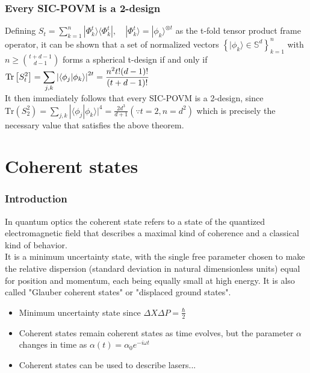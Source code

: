 \documentclass{beamer}
\begin{document}
\begin{frame}
  \frametitle{Every SIC-POVM is a 2-design}
  Defining
  ${\displaystyle S_{t}=\displaystyle \sum
        _{k=1}^{n}|\Phi _{k}^{t}\rangle \langle \Phi _{k}^{t}|,\quad |\Phi
        _{k}^{t}\rangle =|\phi _{k}\rangle ^{\otimes t}}$ as the t-fold tensor
  product frame operator,
  it can be shown that a set of normalized vectors
  ${\displaystyle \left\{|\phi _{k}\rangle \in
    \mathbb {S} ^{d}\right\}_{k=1}^{n}}$ with
  ${\displaystyle n\geq \binom{t+d-1}{d-1}}$ forms a spherical t-design if and
  only if ${\displaystyle \displaystyle \mathrm {Tr}
    \left[S_{t}^{2}\right]=\sum _{j,k}\left|\langle \phi _{j}|\phi _{k}\rangle
    \right|^{2t}={\frac {n^{2}t!(d-1)!}{(t+d-1)!}}}$\\
  It then immediately follows that every SIC-POVM is a 2-design, since
  ${\displaystyle \mathrm {Tr} (S_{2}^{2})=\displaystyle
    \sum _{j,k}|\langle \phi _{j}|\phi _{k}\rangle |^{4}={\frac {2d^{3}}{d+1}}} (\because t=2, n=d^{2})$
  which is precisely the necessary value that satisfies the above theorem.
\end{frame}

\section{Coherent states}
\begin{frame}
  \frametitle{Introduction}
  In quantum optics the coherent state refers to a state of the quantized electromagnetic field
  that describes a maximal kind of coherence and a classical kind of behavior.\\
  It is a minimum uncertainty state, with the single free parameter chosen to make the relative
  dispersion (standard deviation in natural dimensionless units) equal for position and momentum,
  each being equally small at high energy. It is also called "Glauber coherent states" or "displaced ground states".
  \begin{itemize}
    \item Minimum uncertainty state since $\Delta{X}\Delta{P}=\frac{\hbar}{2}$
    \item Coherent states remain coherent states as time
          evolves, but the parameter $\alpha$ changes in time as
          $\alpha(t) = \alpha_{0}e^{-i\omega t}$
    \item Coherent states can be used to describe lasers...
  \end{itemize}
\end{frame}
\end{document}
